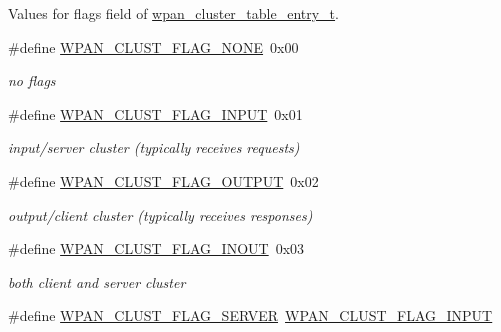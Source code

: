 Values for {\ttfamily flags} field of \hyperlink{structwpan__cluster__table__entry__t}{wpan\+\_\+cluster\+\_\+table\+\_\+entry\+\_\+t}. \begin{DoxyCompactItemize}
\item 
\mbox{\label{group__wpan__aps_ga738343e3e3392f22d0a5d7615648ba53}} 
\#define \hyperlink{group__wpan__aps_ga738343e3e3392f22d0a5d7615648ba53}{W\+P\+A\+N\+\_\+\+C\+L\+U\+S\+T\+\_\+\+F\+L\+A\+G\+\_\+\+N\+O\+NE}~0x00
\begin{DoxyCompactList}\small\item\em no flags \end{DoxyCompactList}\item 
\mbox{\label{group__wpan__aps_ga2024b5d21c6f8c2f151cc2b0576c08f4}} 
\#define \hyperlink{group__wpan__aps_ga2024b5d21c6f8c2f151cc2b0576c08f4}{W\+P\+A\+N\+\_\+\+C\+L\+U\+S\+T\+\_\+\+F\+L\+A\+G\+\_\+\+I\+N\+P\+UT}~0x01
\begin{DoxyCompactList}\small\item\em input/server cluster (typically receives requests) \end{DoxyCompactList}\item 
\mbox{\label{group__wpan__aps_ga0456c33bdaa673f37f9285a3f5ca0172}} 
\#define \hyperlink{group__wpan__aps_ga0456c33bdaa673f37f9285a3f5ca0172}{W\+P\+A\+N\+\_\+\+C\+L\+U\+S\+T\+\_\+\+F\+L\+A\+G\+\_\+\+O\+U\+T\+P\+UT}~0x02
\begin{DoxyCompactList}\small\item\em output/client cluster (typically receives responses) \end{DoxyCompactList}\item 
\mbox{\label{group__wpan__aps_gaf1185ec162a18803e11a83491bf57d3d}} 
\#define \hyperlink{group__wpan__aps_gaf1185ec162a18803e11a83491bf57d3d}{W\+P\+A\+N\+\_\+\+C\+L\+U\+S\+T\+\_\+\+F\+L\+A\+G\+\_\+\+I\+N\+O\+UT}~0x03
\begin{DoxyCompactList}\small\item\em both client and server cluster \end{DoxyCompactList}\item 
\mbox{\label{group__wpan__aps_ga9e0a1a0abf5594d8fa5a38b1ca40b3bc}} 
\#define \hyperlink{group__wpan__aps_ga9e0a1a0abf5594d8fa5a38b1ca40b3bc}{W\+P\+A\+N\+\_\+\+C\+L\+U\+S\+T\+\_\+\+F\+L\+A\+G\+\_\+\+S\+E\+R\+V\+ER}~\hyperlink{group__wpan__aps_ga2024b5d21c6f8c2f151cc2b0576c08f4}{W\+P\+A\+N\+\_\+\+C\+L\+U\+S\+T\+\_\+\+F\+L\+A\+G\+\_\+\+I\+N\+P\+UT}

\end{DoxyCompactItemize}
